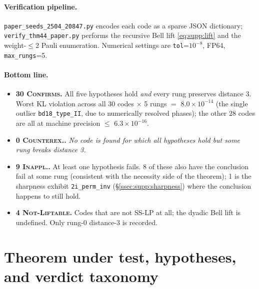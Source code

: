 \documentclass[11pt]{article}
\newcommand{\vCONF}{\textcolor{cConfirm}{\textsc{Confirms}}}
\newcommand{\vINAP}{\textcolor{cInapp}{\textsc{Inappl.}}}
\newcommand{\vLIFT}{\textcolor{cLift}{\textsc{Not-Liftable}}}
\newcommand{\vCNTR}{\textcolor{cCounter}{\textsc{Counterex.}}}
\newcommand{\enot}[2]{\ensuremath{#1\!\times\!10^{#2}}}
\begin{document}
\paragraph{Verification pipeline.}
\texttt{paper\_seeds\_2504\_20847.py} encodes each code as a sparse JSON
dictionary; \texttt{verify\_thm44\_paper.py} performs the recursive Bell lift
\eqref{eq:supp:lift} and the weight-$\le2$ Pauli enumeration. Numerical settings
are \texttt{tol}=$10^{-8}$, FP64, \texttt{max\_rungs}=5.

\paragraph{Bottom line.}
\begin{itemize}[leftmargin=2em]
\item \textbf{30 \vCONF.} All five hypotheses hold \emph{and} every rung
preserves distance 3. Worst KL violation across all 30 codes $\times$ 5 rungs
$=$ \enot{8.0}{-14} (the single outlier
\texttt{bd18\_type\_II}, due to numerically resolved phases); the other 28
codes are all at machine precision $\le$ \enot{6.3}{-16}.
\item \textbf{0 \vCNTR.} \emph{No code is found for which all hypotheses hold
but some rung breaks distance 3.}
\item \textbf{9 \vINAP.} At least one hypothesis fails. 8 of these
also have the conclusion fail at some rung (consistent with the necessity
side of the theorem); 1 is the sharpness exhibit \texttt{2i\_perm\_inv}
(\S\ref{ssec:supp:sharpness}) where the conclusion happens to still hold.
\item \textbf{4 \vLIFT.} Codes that are not SS-LP at all; the dyadic Bell lift
is undefined. Only rung-0 distance-3 is recorded.
\end{itemize}

\section{Theorem under test, hypotheses, and verdict taxonomy}
\label{sec:supp:taxonomy}
\end{document}
